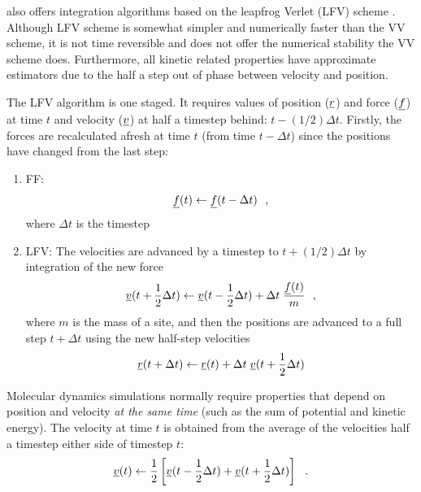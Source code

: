 \D also offers integration algorithms based on the leapfrog Verlet
(LFV) scheme \cite{allen-89a}.  Although LFV scheme is somewhat
simpler and numerically faster than the VV scheme, it is not time
reversible and does not offer the numerical stability the VV scheme
does.  Furthermore, all kinetic related properties have approximate
estimators due to the half a step out of phase between velocity and position.

The LFV algorithm is one staged.  It requires values of position
($\mbox{$\underline{r}$}$) and force ($\mbox{$\underline{f}$}$) at time $t$ and  velocity
($\mbox{$\underline{v}$}$) at half a timestep behind: $t-(1/2)\Delta t$.  Firstly,
the forces are recalculated afresh at time $t$ (from time
$t-\Delta t$) since the positions have changed from the last step:
\begin{enumerate}
\item FF:
\begin{equation}
\mbox{$\underline{f}$}(t) \leftarrow \mbox{$\underline{f}$}(t - \Delta t)~~,
\end{equation}
where $\Delta t$ is the timestep
\item LFV:
\newline The velocities are advanced by a timestep to
$t+(1/2)\Delta t$ by integration of the new force
\begin{equation}
\mbox{$\underline{v}$}(t + {1 \over 2} \Delta t) \leftarrow \mbox{$\underline{v}$}(t - {1 \over 2} \Delta t) +
\Delta t \; {\mbox{$\underline{f}$}(t) \over m}~~,
\end{equation}
where $m$ is the mass of a site, and then the positions are
advanced to a full step $t+\Delta t$ using the new half-step
velocities
\begin{equation}
\mbox{$\underline{r}$}(t + \Delta t) \leftarrow \mbox{$\underline{r}$}(t) + \Delta t \;
\mbox{$\underline{v}$}(t + {1 \over 2}\Delta t)
\end{equation}
\end{enumerate}
Molecular dynamics simulations normally require properties that
depend on position and velocity {\em at the same time} (such as
the sum of potential and kinetic energy).  The velocity at time
$t$ is obtained from the average of the velocities half a timestep
either side of timestep $t$:
\begin{equation}
\mbox{$\underline{v}$}(t) \leftarrow {1 \over 2} \left[ \mbox{$\underline{v}$}(t - {1 \over 2} \Delta t) +
\mbox{$\underline{v}$}(t + {1 \over 2} \Delta t) \right]~~.
\end{equation}

